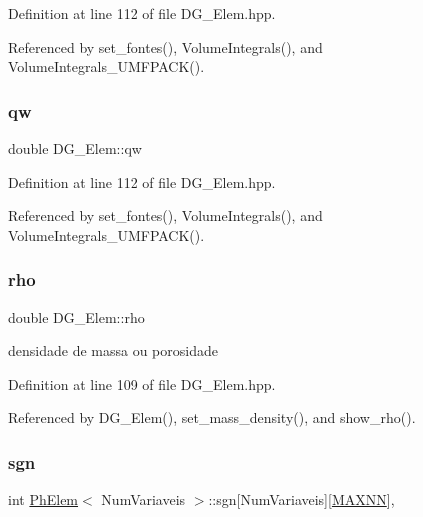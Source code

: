 Definition at line 112 of file D\+G\+\_\+\+Elem.\+hpp.



Referenced by set\+\_\+fontes(), Volume\+Integrals(), and Volume\+Integrals\+\_\+\+U\+M\+F\+P\+A\+C\+K().

\mbox{\label{classDG__Elem_a89d2130d5e677207cb6c962dc90f79b3}} 
\subsubsection{\texorpdfstring{qw}{qw}}
{\footnotesize\ttfamily double D\+G\+\_\+\+Elem\+::qw\hspace{0.3cm}{\ttfamily [private]}}



Definition at line 112 of file D\+G\+\_\+\+Elem.\+hpp.



Referenced by set\+\_\+fontes(), Volume\+Integrals(), and Volume\+Integrals\+\_\+\+U\+M\+F\+P\+A\+C\+K().

\mbox{\label{classDG__Elem_a56be853c8e67f9ee71f6b07aa99b3a58}} 
\subsubsection{\texorpdfstring{rho}{rho}}
{\footnotesize\ttfamily double D\+G\+\_\+\+Elem\+::rho\hspace{0.3cm}{\ttfamily [private]}}



densidade de massa ou porosidade 



Definition at line 109 of file D\+G\+\_\+\+Elem.\+hpp.



Referenced by D\+G\+\_\+\+Elem(), set\+\_\+mass\+\_\+density(), and show\+\_\+rho().

\mbox{\label{classPhElem_a5bb9ccd4ccebf12ff0937d807c443caf}} 
\subsubsection{\texorpdfstring{sgn}{sgn}}
{\footnotesize\ttfamily int \hyperlink{classPhElem}{Ph\+Elem}$<$ Num\+Variaveis $>$\+::sgn\mbox{[}Num\+Variaveis\mbox{]}\mbox{[}\hyperlink{MyOptions_8h_a2f91e7a0b4bf68a62a0f3d38904dea2c}{M\+A\+X\+NN}\mbox{]}\hspace{0.3cm}{\ttfamily [protected]}, {\ttfamily [inherited]}}



